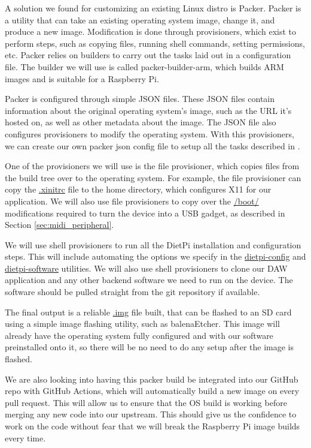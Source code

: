 A solution we found for customizing an existing Linux distro is Packer. Packer is a
utility that can take an existing operating system image, change it, and produce a new
image. Modification is done through provisioners, which exist to perform steps, such as
copying files, running shell commands, setting permissions, etc. Packer relies on builders
to carry out the tasks laid out in a configuration file. The builder we will use is called
packer-builder-arm, which builds ARM images and is suitable for a Raspberry Pi.

Packer is configured through simple JSON files. These JSON files contain information about
the original operating system's image, such as the URL it's hosted on, as well as other
metadata about the image. The JSON file also configures provisioners to modify the
operating system. With this provisioners, we can create our own packer json config file to
setup all the tasks described in .

One of the provisioners we will use is the file provisioner, which copies files from the
build tree over to the operating system. For example, the file provisioner can copy the
\url{.xinitrc} file to the home directory, which configures X11 for our application.
We will also use file provisioners to copy over the \url{/boot/} modifications required to
turn the device into a USB gadget, as described in Section \ref{sec:midi_peripheral}.

We will use shell provisioners to run all the DietPi installation and configuration steps.
This will include automating the options we specify in the \url{dietpi-config} and
\url{dietpi-software} utilities. We will also use shell provisioners to clone our DAW
application and any other backend software we need to run on the device. The software
should be pulled straight from the git repository if available.

The final output is a reliable \url{.img} file built, that can be flashed to an SD card
using a simple image flashing utility, such as balenaEtcher. This image will already have
the operating system fully configured and with our software preinstalled onto it, so there
will be no need to do any setup after the image is flashed.

We are also looking into having this packer build be integrated into our GitHub repo with
GitHub Actions, which will automatically build a new image on every pull request. This
will allow us to ensure that the OS build is working before merging any new code into our
upstream. This should give us the confidence to work on the code without fear that we will
break the Raspberry Pi image builds every time.

